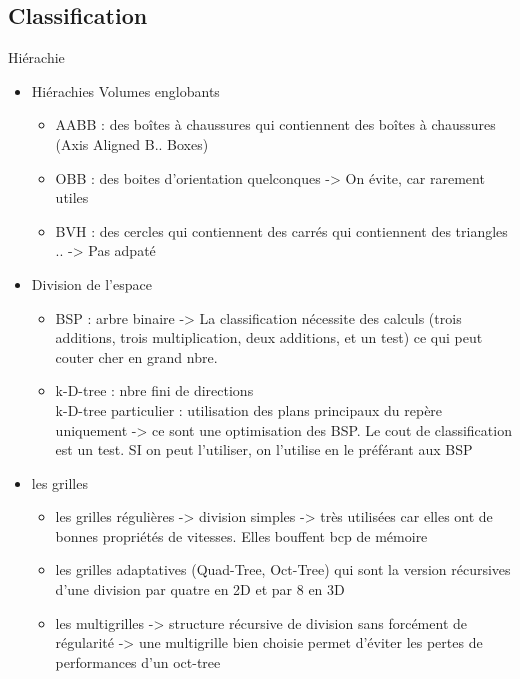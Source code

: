\documentclass[11pt]{article}
\begin{document}
{\subsection{Classification}
Hiérachie 
\begin{itemize}
	\item Hiérachies Volumes englobants
		\begin{itemize}
			\item AABB : des boîtes à chaussures qui contiennent des boîtes à chaussures (Axis Aligned B.. Boxes)
			\item OBB : des boites d'orientation quelconques -> On évite, car rarement utiles
			\item BVH : des cercles qui contiennent des carrés qui contiennent des triangles .. -> Pas adpaté
		\end{itemize}
	\item Division de l'espace
		\begin{itemize}
			\item BSP : arbre binaire -> La classification nécessite des calculs (trois additions, trois multiplication, deux additions, et un test) ce qui peut couter cher en grand nbre.
			\item k-D-tree : nbre fini de directions\\
				k-D-tree particulier : utilisation des plans principaux du repère uniquement -> ce sont une optimisation des BSP. Le cout de classification est un test. SI on peut l'utiliser, on l'utilise en le préférant aux BSP
		\end{itemize}
		\item les grilles
			\begin{itemize}
				\item les grilles régulières -> division simples -> très utilisées car elles ont de bonnes propriétés de vitesses. Elles bouffent bcp de mémoire 
				\item les grilles adaptatives (Quad-Tree, Oct-Tree) qui sont la version récursives d'une division par quatre en 2D et par 8 en 3D
				\item les multigrilles -> structure récursive de division sans forcément de régularité -> une multigrille bien choisie permet d'éviter les pertes de performances d'un oct-tree
			\end{itemize}
\end{itemize}

}
\end{document}
